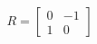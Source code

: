 \documentclass[preview]{standalone}
\begin{document}
\begin{align*}
R = \begin{bmatrix} 0 & -1 \\ 1 & 0 \end{bmatrix}
\end{align*}
\end{document}
